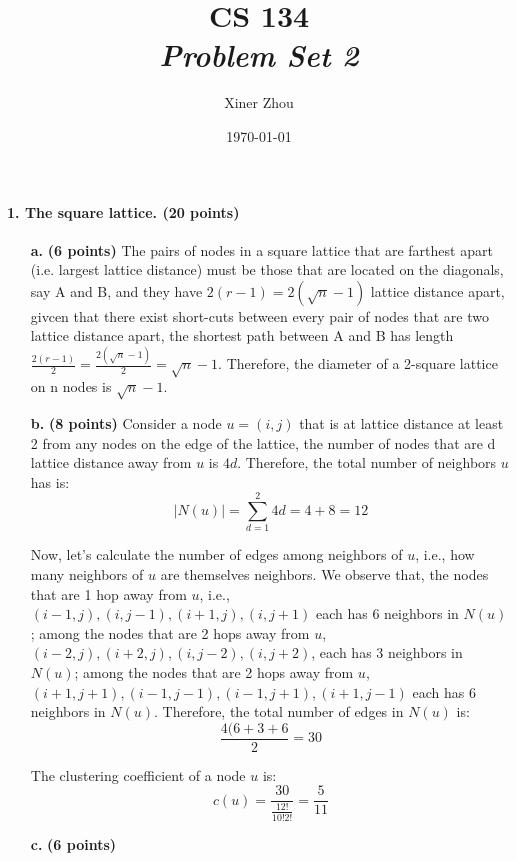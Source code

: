 \documentclass[11pt]{article} %
\title{CS 134 \\ \emph{Problem Set 2}}
\author{Xiner Zhou}
\date{\today} %
\begin{document}
 
\maketitle

\paragraph{1. The square lattice. (20 points)}

\begin{enumerate}

\item[\textbf{a.}] \textbf{(6 points)}  
The pairs of nodes in a square lattice that are farthest apart (i.e. largest lattice distance) must be those that are located on the diagonals, say A and B, and they have $2(r-1)=2(\sqrt{n}-1)$ lattice distance apart, givcen that there exist short-cuts between every pair of nodes that are two lattice distance apart, the shortest path between A and B has length $\frac{2(r-1)}{2}=\frac{2(\sqrt{n}-1)}{2}=\sqrt{n}-1$. Therefore, the diameter of a 2-square lattice on n nodes is $\sqrt{n}-1$.

\item[\textbf{b.}] \textbf{(8 points)}  
Consider a node $u=(i,j)$ that is at lattice distance at least 2 from any nodes on the edge of the lattice, the number of nodes that are d lattice distance away from $u$ is $4d$. Therefore, the total number of neighbors $u$ has is: $$ |N(u)|=\sum \limits_{d=1}^{2} 4d=4+8=12 $$

Now, let's calculate the number of edges among neighbors of $u$, i.e., how many neighbors of $u$ are themselves neighbors. We observe that, the nodes that are 1 hop away from $u$, i.e., $(i-1,j),(i,j-1),(i+1,j),(i,j+1)$ each has 6 neighbors in $N(u)$; among the nodes that are 2 hops away from $u$, $(i-2,j),(i+2,j),(i,j-2),(i,j+2)$, each has 3 neighbors in $N(u)$; among the nodes that are 2 hops away from $u$, $(i+1,j+1),(i-1,j-1),(i-1,j+1),(i+1,j-1)$ each has 6 neighbors in $N(u)$. Therefore, the total number of edges in $N(u)$ is: $$\frac{4(6+3+6}{2}=30$$

The clustering coefficient of a node $u$ is: $$\displaystyle{ c(u)= \frac{30}{\frac{12!}{10! 2!}}=\frac{5}{11}}$$

\item[\textbf{c.}] \textbf{(6 points)} 

\begin{center}
\begin{tikzpicture}[node distance=1.5cm, scale=1]


\end{tikzpicture}
\end{center}
\end{enumerate}
\end{document}

